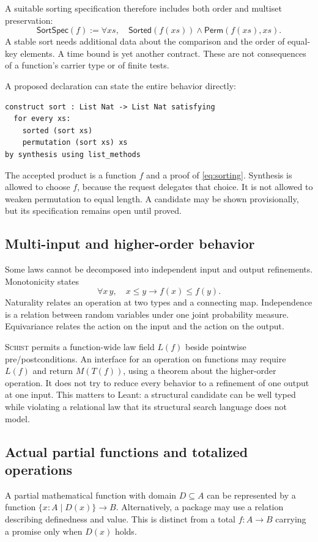\documentclass[11pt,a4paper]{article}
\newcommand{\Schist}{\textsc{Schist}}
\theoremstyle{definition}
\begin{document}
A suitable sorting specification therefore includes both order and multiset
preservation:
\begin{equation}\label{eq:sorting}
 \mathsf{SortSpec}(f):=\forall xs,\quad
 \mathsf{Sorted}(f(xs))\land\mathsf{Perm}(f(xs),xs).
\end{equation}
A stable sort needs additional data about the comparison and the order of
equal-key elements. A time bound is yet another contract. These are not
consequences of a function's carrier type or of finite tests.

A proposed declaration can state the entire behavior directly:
\begin{lstlisting}
construct sort : List Nat -> List Nat satisfying
  for every xs:
    sorted (sort xs)
    permutation (sort xs) xs
by synthesis using list_methods
\end{lstlisting}
The accepted product is a function $f$ and a proof of \eqref{eq:sorting}.
Synthesis is allowed to choose $f$, because the request delegates that choice.
It is not allowed to weaken permutation to equal length. A candidate may be
shown provisionally, but its specification remains open until proved.

\subsection{Multi-input and higher-order behavior}
Some laws cannot be decomposed into independent input and output refinements.
Monotonicity states
\[
 \forall x\,y,\quad x\le y\to f(x)\le f(y).
\]
Naturality relates an operation at two types and a connecting map. Independence
is a relation between random variables under one joint probability measure.
Equivariance relates the action on the input and the action on the output.

\Schist{} permits a function-wide law field $L(f)$ beside pointwise
pre/postconditions. An interface for an operation on functions may require
$L(f)$ and return $M(T(f))$, using a theorem about the higher-order operation.
It does not try to reduce every behavior to a refinement of one output at one
input. This matters to Leant: a structural candidate can be well typed while
violating a relational law that its structural search language does not model.

\subsection{Actual partial functions and totalized operations}
A partial mathematical function with domain $D\subseteq A$ can be represented
by a function $\{x:A\mid D(x)\}\to B$. Alternatively, a package may use a
relation describing definedness and value. This is distinct from a total
$f:A\to B$ carrying a promise only when $D(x)$ holds.
\end{document}
